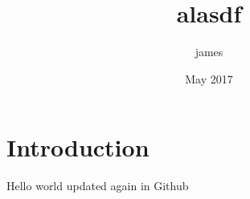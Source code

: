 \documentclass{article}
\title{alasdf}
\author{james }
\date{May 2017}
\begin{document}
\maketitle

\section{Introduction}

Hello world updated again in Github
\end{document}
